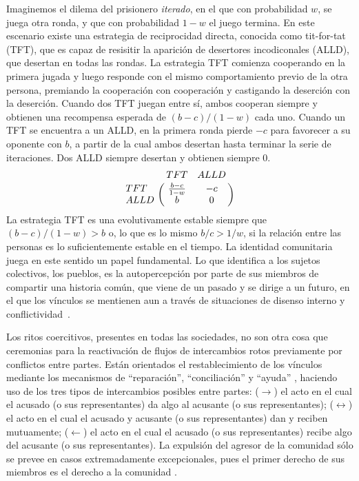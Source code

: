 \documentclass[a4paper,10pt]{book}
\begin{document}

Imaginemos el dilema del prisionero \emph{iterado}, en el que con probabilidad $w$, se juega otra ronda, y que con probabilidad $1 - w$ el juego termina.
En este escenario existe una estrategia de reciprocidad directa, conocida como tit-for-tat (TFT), que es capaz de resisitir la aparición de desertores incodiconales (ALLD), que desertan en todas las rondas.
La estrategia TFT comienza cooperando en la primera jugada y luego responde con el mismo comportamiento previo de la otra persona, premiando la cooperación con cooperación y castigando la deserción con la deserción.
Cuando dos TFT juegan entre sí, ambos cooperan siempre y obtienen una recompensa esperada de $(b - c)/(1 - w)$ cada uno.
Cuando un TFT se encuentra a un ALLD, en la primera ronda pierde $-c$ para favorecer a su oponente con $b$, a partir de la cual ambos desertan hasta terminar la serie de iteraciones.
Dos ALLD siempre desertan y obtienen siempre $0$.
\begin{equation}
    \bordermatrix{ & TFT & ALLD \cr
      TFT & \frac{b-c}{1-w} & -c \cr
      ALLD & b & 0  } 
\end{equation}
La estrategia TFT es una evolutivamente estable siempre que $(b - c)/(1 - w) > b$ o, lo que es lo mismo $b/c > 1/w$, si la relación entre las personas es lo suficientemente estable en el tiempo.
La identidad comunitaria juega en este sentido un papel fundamental.
Lo que identifica a los sujetos colectivos, los pueblos, es la autopercepción por parte de sus miembros de compartir una historia común, que viene de un pasado y se dirige a un futuro, en el que los vínculos se mentienen aun a través de situaciones de disenso interno y conflictividad~\cite{segato2016-guerraContraLasMujeres}.


Los ritos coercitivos, presentes en todas las sociedades, no son otra cosa que ceremonias para la reactivación de flujos de intercambios rotos previamente por conflictos entre partes.
Están orientados el restablecimiento de los vínculos mediante los mecanismos de ``reparación'', ``conciliación'' y ``ayuda'' \cite{zaffaroni2013-cuestionCriminal}, haciendo uso de los tres tipos de intercambios posibles entre partes: 
($\rightarrow$) el acto en el cual el acusado (o sus representantes) da algo al acusante (o sus representantes);
($\leftrightarrow$) el acto en el cual el acusado y acusante (o sus representantes) dan y reciben mutuamente;
($\leftarrow$) el acto en el cual el acusado (o sus representantes) recibe algo del acusante (o sus representantes).
La expulsión del agresor de la comunidad sólo se prevee en casos extremadamente excepcionales, pues el primer derecho de sus miembros es el derecho a la comunidad \cite{segato}.
\end{document}
